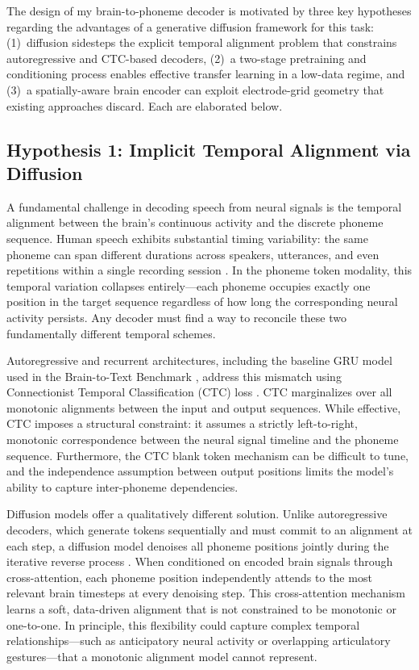 \documentclass{article}
\begin{document}
The design of my brain-to-phoneme decoder is motivated by three
key hypotheses regarding the advantages of a generative diffusion
framework for this task: (1)~diffusion sidesteps the explicit temporal
alignment problem that constrains autoregressive and CTC-based
decoders, (2)~a two-stage pretraining and conditioning process enables
effective transfer learning in a low-data regime, and (3)~a
spatially-aware brain encoder can exploit electrode-grid geometry that
existing approaches discard. Each are elaborated below.
 
\subsection{Hypothesis 1: Implicit Temporal Alignment via Diffusion}
\label{sec:alignment}
 
A fundamental challenge in decoding speech from neural signals is the
temporal alignment between the brain's continuous activity and the
discrete phoneme sequence.  Human speech exhibits
substantial timing variability: the same phoneme can span different
durations across speakers, utterances, and even repetitions within a
single recording session \cite{willett2023high}.  In the phoneme
token modality, this temporal variation collapses entirely---each
phoneme occupies exactly one position in the target sequence regardless
of how long the corresponding neural activity persists.  Any decoder
must find a way to reconcile these two fundamentally different temporal schemes.
 
Autoregressive and recurrent architectures, including the baseline GRU
model used in the Brain-to-Text Benchmark \cite{willett2024lessons},
address this mismatch using Connectionist Temporal Classification
(CTC) loss \cite{graves2006ctc}. CTC marginalizes over all
monotonic alignments between the input and output sequences.  While
effective, CTC imposes a structural constraint: it assumes a strictly
left-to-right, monotonic correspondence between the neural signal
timeline and the phoneme sequence.  Furthermore, the CTC blank token
mechanism can be difficult to tune, and the independence assumption
between output positions limits the model's ability to capture
inter-phoneme dependencies.
 
Diffusion models offer a qualitatively different solution.  Unlike
autoregressive decoders, which generate tokens sequentially and must
commit to an alignment at each step, a diffusion model denoises all
phoneme positions jointly during the iterative reverse process
\cite{ho2020denoising}.  When conditioned on encoded brain signals
through cross-attention, each phoneme position independently attends
to the most relevant brain timesteps at every denoising step.  This
cross-attention mechanism learns a soft, data-driven alignment that
is not constrained to be monotonic or one-to-one.  In principle, this
flexibility could capture complex temporal relationships---such as
anticipatory neural activity or overlapping articulatory
gestures---that a monotonic alignment model cannot represent.
 
\end{document}
